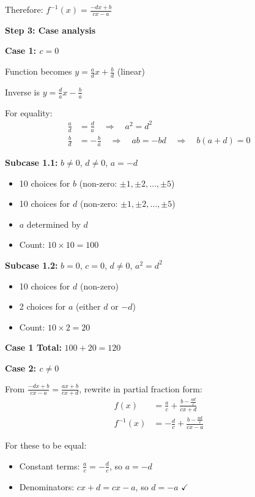 \documentclass[12pt]{article}
\begin{document}
Therefore: $f^{-1}(x) = \frac{-dx+b}{cx-a}$

\textbf{Step 3: Case analysis}

\textbf{Case 1: $c=0$}

Function becomes $y = \frac{a}{d}x + \frac{b}{d}$ (linear)

Inverse is $y = \frac{d}{a}x - \frac{b}{a}$

For equality:
\begin{align*}
\frac{a}{d} &= \frac{d}{a} \quad \Rightarrow \quad a^2 = d^2\\
\frac{b}{d} &= -\frac{b}{a} \quad \Rightarrow \quad ab = -bd \quad \Rightarrow \quad b(a+d) = 0
\end{align*}

\textbf{Subcase 1.1:} $b \neq 0$, $d \neq 0$, $a = -d$
\begin{itemize}
    \item 10 choices for $b$ (non-zero: $\pm 1, \pm 2, \ldots, \pm 5$)
    \item 10 choices for $d$ (non-zero: $\pm 1, \pm 2, \ldots, \pm 5$)
    \item $a$ determined by $d$
    \item Count: $10 \times 10 = 100$
\end{itemize}

\textbf{Subcase 1.2:} $b = 0$, $c = 0$, $d \neq 0$, $a^2 = d^2$
\begin{itemize}
    \item 10 choices for $d$ (non-zero)
    \item 2 choices for $a$ (either $d$ or $-d$)
    \item Count: $10 \times 2 = 20$
\end{itemize}

\textbf{Case 1 Total:} $100 + 20 = 120$

\textbf{Case 2: $c \neq 0$}

From $\frac{-dx+b}{cx-a} = \frac{ax+b}{cx+d}$, rewrite in partial fraction form:
\begin{align*}
f(x) &= \frac{a}{c} + \frac{b-\frac{ad}{c}}{cx+d}\\
f^{-1}(x) &= -\frac{d}{c} + \frac{b-\frac{ad}{c}}{cx-a}
\end{align*}

For these to be equal:
\begin{itemize}
    \item Constant terms: $\frac{a}{c} = -\frac{d}{c}$, so $a = -d$
    \item Denominators: $cx+d = cx-a$, so $d = -a$ $\checkmark$
\end{itemize}
\end{document}
